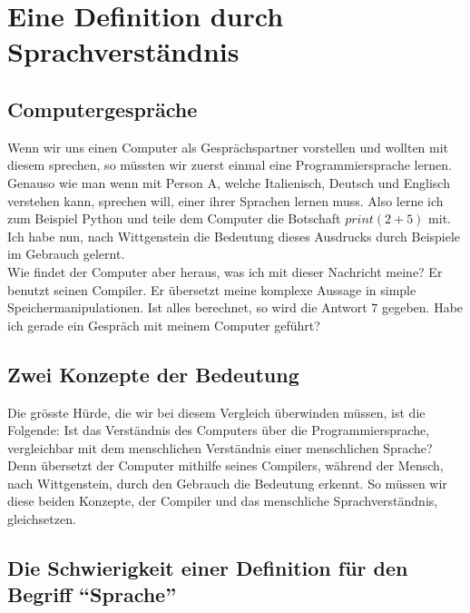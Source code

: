 \documentclass[a4paper,10pt]{article}
\begin{document}
\section{Eine Definition durch Sprachverständnis}
\subsection{Computergespräche}
Wenn wir uns einen Computer als Gesprächspartner vorstellen und wollten mit diesem sprechen, so müssten wir zuerst einmal eine Programmiersprache lernen. Genauso wie man wenn mit Person A, welche Italienisch, Deutsch und Englisch verstehen kann, sprechen will, einer ihrer Sprachen lernen muss. Also lerne ich zum Beispiel Python und teile dem Computer die Botschaft $print(2 + 5)$ mit. Ich habe nun, nach Wittgenstein die Bedeutung dieses Ausdrucks durch Beispiele im Gebrauch gelernt.  \\
Wie findet der Computer aber heraus, was ich mit dieser Nachricht meine? Er benutzt seinen Compiler. Er übersetzt meine komplexe Aussage in simple Speichermanipulationen. Ist alles berechnet, so wird die Antwort $7$ gegeben. Habe ich gerade ein Gespräch mit meinem Computer geführt?

\subsection{Zwei Konzepte der Bedeutung}
Die grösste Hürde, die wir bei diesem Vergleich überwinden müssen, ist die Folgende: Ist das Verständnis des Computers über die Programmiersprache, vergleichbar mit dem menschlichen Verständnis einer menschlichen Sprache? Denn übersetzt der Computer mithilfe seines Compilers, während der Mensch, nach Wittgenstein, durch den Gebrauch die Bedeutung erkennt. So müssen wir diese beiden Konzepte, der Compiler und das menschliche Sprachverständnis, gleichsetzen.

\subsection{Die Schwierigkeit einer Definition für den Begriff \enquote{Sprache}}
\end{document}
